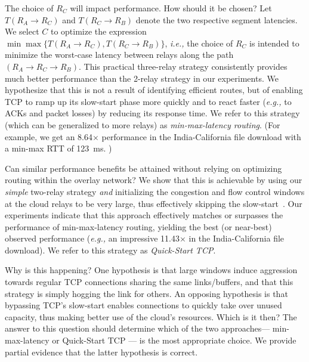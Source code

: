 \documentclass{hotnets17}
\newcommand{\mycomm}[3]{{\color{#2} \textbf{[#1: #3]}}}
\newcommand{\mycomm}[3]{}
\newcommand{\IK}[1]{\mycomm{IK}{blue}{#1}}
\newcommand{\AB}[1]{\mycomm{AB}{Orange}{#1}}
\providecommand{\ie}{\emph{i.e.,} }
\providecommand{\eg}{\emph{e.g.,} }
\begin{document}
The choice of $R_C$ will impact performance. How should it be chosen? Let $T({R_A \to R_C})$ and $T({R_C \to R_B})$ denote the two respective segment latencies.
We select $C$  to optimize the expression $\min\max\{T({R_A \to R_C}),T({R_C \to R_B})\}$, \ie the choice of $R_C$ is intended to minimize the worst-case latency between relays along the path $(R_A \to R_C \to R_B)$. This {practical} three-relay strategy consistently provides much better performance than the 2-relay strategy in our experiments. We hypothesize that this is not a result of identifying efficient routes, but of enabling TCP to ramp up its slow-start phase more quickly and to react faster (\eg to ACKs and packet losses) by reducing its response time. We refer to this strategy (which can be generalized to more relays) as \emph{min-max-latency routing}. (For example,  we get an 8.64$\times$ performance in the India-California file download with a min-max RTT of 123~ms. ) 

\vspace{0.05in} Can similar performance benefits be attained without relying on optimizing routing within the overlay network? We show that this is achievable by using our \textit{simple} 
two-relay strategy \emph{and} initializing the congestion and flow control windows at the cloud relays to be very large, thus effectively skipping the slow-start~\cite{dukkipati2010}. Our experiments indicate that this approach effectively matches or surpasses the performance of min-max-latency routing, yielding the best (or near-best) observed performance (\eg an impressive 11.43$\times$ in the India-California file download). We refer to this strategy as \emph{Quick-Start TCP}.

Why is this happening? One hypothesis is that large windows induce aggression towards regular TCP connections sharing the same links/buffers, and that 
this strategy is simply hogging the link for others. An opposing hypothesis is that bypassing TCP's slow-start enables connections to quickly take over unused capacity, thus making better use of the cloud's resources. Which is it then? The answer to this question should determine which of the two approaches--- min-max-latency or Quick-Start TCP --- is the most appropriate choice. We provide partial evidence that the latter hypothesis is correct.
\end{document}
